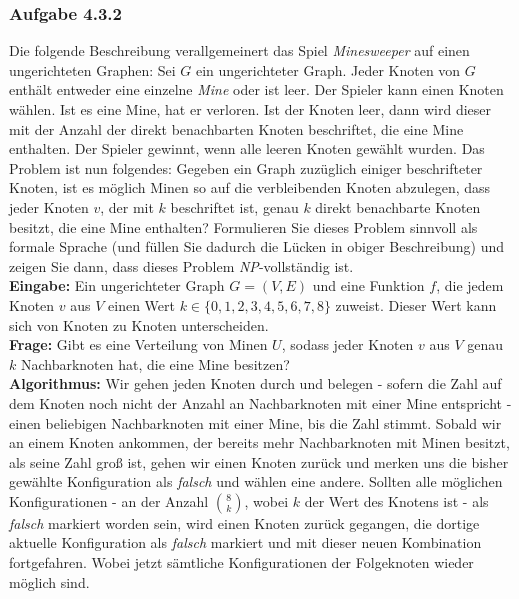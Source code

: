 \documentclass{article}
\begin{document}
\subsubsection{Aufgabe 4.3.2}
Die folgende Beschreibung verallgemeinert das Spiel \textit{Minesweeper} auf einen ungerichteten Graphen:
Sei $G$ ein ungerichteter Graph.
Jeder Knoten von $G$ enthält entweder eine einzelne \textit{Mine} oder ist leer.
Der Spieler kann einen Knoten wählen.
Ist es eine Mine, hat er verloren.
Ist der Knoten leer, dann wird dieser mit der Anzahl der direkt benachbarten Knoten beschriftet, die eine Mine enthalten.
Der Spieler gewinnt, wenn alle leeren Knoten gewählt wurden.
Das Problem ist nun folgendes: Gegeben ein Graph zuzüglich einiger beschrifteter Knoten, ist es möglich Minen so auf die verbleibenden Knoten abzulegen, dass jeder Knoten $v$, der mit $k$ beschriftet ist, genau $k$ direkt benachbarte Knoten besitzt, die eine Mine enthalten?
Formulieren Sie dieses Problem sinnvoll als formale Sprache (und füllen Sie dadurch die Lücken in obiger Beschreibung) und zeigen Sie dann, dass dieses Problem \textit{NP}-vollständig ist.
\vspace{1cm}\-\\
\textbf{Eingabe:}
Ein ungerichteter Graph $G = (V, E)$ und eine Funktion $f$, die jedem Knoten $v$ aus $V$ einen Wert $k \in \{0,1,2,3,4,5,6,7,8\}$ zuweist.
Dieser Wert kann sich von Knoten zu Knoten unterscheiden.\\
\textbf{Frage:}
Gibt es eine Verteilung von Minen $U$, sodass jeder Knoten $v$ aus $V$ genau $k$ Nachbarknoten hat, die eine Mine besitzen?
\vspace{1cm}\-\\
\textbf{Algorithmus:}
Wir gehen jeden Knoten durch und belegen - sofern die Zahl auf dem Knoten noch nicht der Anzahl an Nachbarknoten mit einer Mine entspricht - einen beliebigen Nachbarknoten mit einer Mine, bis die Zahl stimmt.
Sobald wir an einem Knoten ankommen, der bereits mehr Nachbarknoten mit Minen besitzt, als seine Zahl groß ist, %
gehen wir einen Knoten zurück und merken uns die bisher gewählte Konfiguration als \textit{falsch} und wählen eine andere.
Sollten alle möglichen Konfigurationen - an der Anzahl $\binom{8}{k}$, wobei $k$ der Wert des Knotens ist - als \textit{falsch} markiert worden sein, wird einen Knoten zurück gegangen, die dortige aktuelle Konfiguration als \textit{falsch} markiert und mit dieser neuen Kombination fortgefahren. Wobei jetzt sämtliche Konfigurationen der Folgeknoten wieder möglich sind.\\
\end{document}
